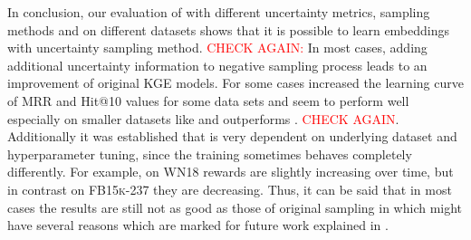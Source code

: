 In conclusion, our evaluation of \ucgan with different uncertainty metrics, sampling methods and on different datasets shows that it is possible to learn embeddings with uncertainty sampling method.
\textcolor{red}{CHECK AGAIN:} In most cases, adding additional uncertainty information to negative sampling process leads to an improvement of original \ac{KGE} models.
For some cases \ucgan increased the learning curve of MRR and Hit@10 values for some data sets and seem to perform well especially on smaller datasets like \umls and outperforms \kbgan. \textcolor{red}{CHECK AGAIN}.
Additionally it was established that \ucgan is very dependent on underlying dataset and hyperparameter tuning, since the training sometimes behaves completely differently.
For example, on \textsc{WN18} rewards are slightly increasing over time, but in contrast on \textsc{FB15k-237} they are decreasing.
Thus, it can be said that in most cases the results are still not as good as those of original sampling in \kbgan which might have several reasons which are marked for future work explained in  .






